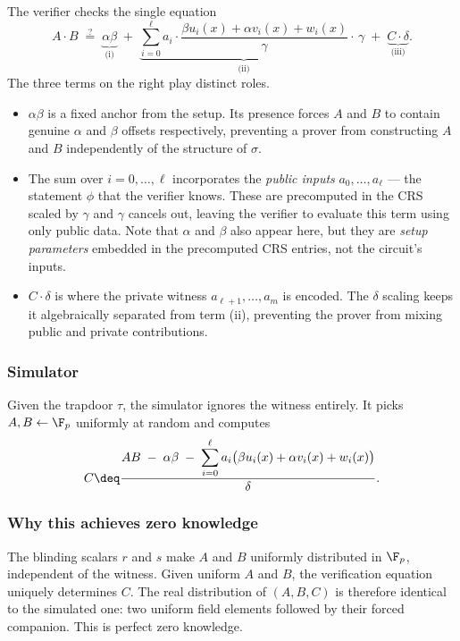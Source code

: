 The verifier checks the single equation
\[
  A \cdot B
  \;\stackrel{?}{=}\;
  \underbrace{\alpha\beta}_{\text{(i)}}
  \;+\;
  \underbrace{\sum_{i=0}^{\ell} a_i \cdot \frac{\beta u_i(x)+\alpha v_i(x)+w_i(x)}{\gamma}}_{\text{(ii)}} \cdot\, \gamma
  \;+\;
  \underbrace{C \cdot \delta}_{\text{(iii)}}.
\]
The three terms on the right play distinct roles.
\begin{itemize}[noitemsep, leftmargin=2em]
  \item[(i)] $\alpha\beta$ is a fixed anchor from the setup. Its presence forces $A$ and $B$ to contain genuine $\alpha$ and $\beta$ offsets respectively, preventing a prover from constructing $A$ and $B$ independently of the structure of $\sigma$.
  \item[(ii)] The sum over $i = 0, \ldots, \ell$ incorporates the \emph{public inputs} $a_0, \ldots, a_\ell$ --- the statement $\phi$ that the verifier knows. These are precomputed in the CRS scaled by $\gamma$ and $\gamma$ cancels out, leaving the verifier to evaluate this term using only public data. Note that $\alpha$ and $\beta$ also appear here, but they are \emph{setup parameters} embedded in the precomputed CRS entries, not the circuit's inputs.
  \item[(iii)] $C \cdot \delta$ is where the private witness $a_{\ell+1}, \ldots, a_m$ is encoded. The $\delta$ scaling keeps it algebraically separated from term (ii), preventing the prover from mixing public and private contributions.
\end{itemize}

\subsubsection*{Simulator}

Given the trapdoor $\tau$, the simulator ignores the witness entirely. It picks $A, B \leftarrow \F_p$ uniformly at random and computes
\[
  C \deq \frac{A B \;-\; \alpha\beta \;-\; \displaystyle\sum_{i=0}^{\ell} a_i\bigl(\beta u_i(x)+\alpha v_i(x)+w_i(x)\bigr)}{\delta}.
\]

\subsubsection*{Why this achieves zero knowledge}

The blinding scalars $r$ and $s$ make $A$ and $B$ uniformly distributed in $\F_p$, independent of the witness. Given uniform $A$ and $B$, the verification equation uniquely determines $C$. The real distribution of $(A, B, C)$ is therefore identical to the simulated one: two uniform field elements followed by their forced companion. This is perfect zero knowledge.

